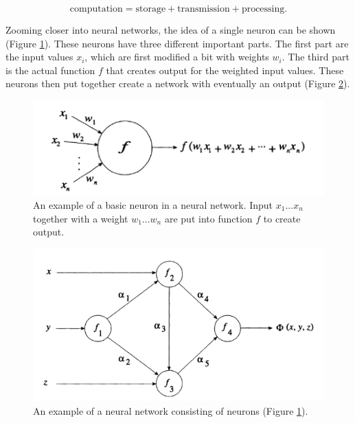 \documentclass[10pt,a4paper]{article}
\begin{document}
	\begin{equation}
		\label{eq:NeuralModels}
		\text{computation} = \text{storage} + \text{transmission} + 
		\text{processing}.
	\end{equation}
	
	Zooming closer into neural networks, the idea of a single neuron can be 
	shown (Figure \ref{fig:NeurEx}). These neurons have three different 
	important parts. The first part are the input values $x_i$, which are first 
	modified a bit with weights $w_i$. The third part is the actual function 
	$f$ that creates output for the weighted input values. These neurons  then 
	put together create a network with eventually an output (Figure 
	\ref{fig:NeurNetEx}).\cite{rojas2013neural}
	
	\begin{figure}[h!]
		\includegraphics{NeuronExample.PNG}
		\caption{An example of a basic neuron in a neural network. Input 
		$x_1...x_n$ together with a weight $w_1...w_n$ are put into function 
		$f$ to create output. \cite{rojas2013neural}}
		\label{fig:NeurEx}
	\end{figure}

	\begin{figure}[h!]
		\includegraphics{NeuralNetworkExample.PNG}
		\caption{An example of a neural network consisting of neurons (Figure 
		\ref{fig:NeurEx}). \cite{rojas2013neural}}
		\label{fig:NeurNetEx}
	\end{figure}
	
\end{document}
